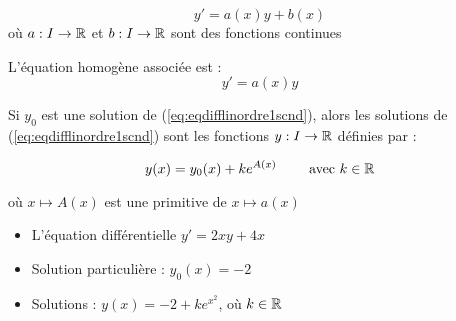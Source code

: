 \begin{frame}
\begin{equation}
   y' = a(x) y  + b(x)
  \label{eq:eqdifflinordre1scnd}
  \tag{$E$}
\end{equation}
où $a : I \to \mathbb{R}$ et $b: I \to \mathbb{R}$ sont des fonctions continues

\pause
L'équation homogène associée est :
\begin{equation}
   y' = a(x) y
  \label{eq:eqdifflinordre1scndhomo}
  \tag{$E_0$}
\end{equation}

\pause
\begin{proposition}
Si $y_0$ est une solution de (\ref{eq:eqdifflinordre1scnd}), 
alors les solutions de (\ref{eq:eqdifflinordre1scnd}) sont les
fonctions $y : I \to \mathbb{R}$ définies par : 

\vspace*{-2ex}
$$y(x)= y_0(x)+k e^{A(x)} \qquad \text{ avec }  k \in \mathbb{R}$$
\vspace*{-3ex}

où $x\mapsto A(x)$ est une primitive de $x \mapsto a(x)$
\end{proposition} 

\pause
{}
\pause
\begin{itemize}
  \item L'équation différentielle $y'=2xy+4x$
  \pause
  \item Solution particulière : $y_0(x)=-2$
  \pause
  \item Solutions :  $y(x) = -2 + ke^{x^2}$, où $k\in\mathbb{R}$
\end{itemize}

\end{frame}


